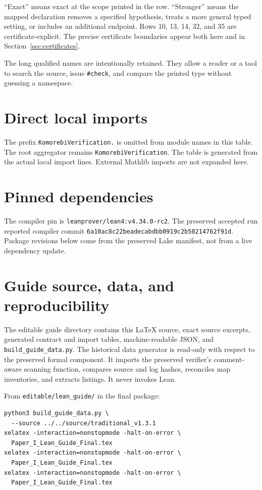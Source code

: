 \documentclass[11pt,a4paper]{article}
\newcommand{\code}[1]{\nolinkurl{#1}}
\begin{document}
``Exact'' means exact at the scope printed in the row. ``Stronger'' means the mapped declaration removes a specified hypothesis, treats a more general typed setting, or includes an additional endpoint. Rows 10, 13, 14, 32, and 35 are certificate-explicit. The precise certificate boundaries appear both here and in Section~\ref{sec:certificates}.

The long qualified names are intentionally retained. They allow a reader or a tool to search the source, issue \texttt{\#check}, and compare the printed type without guessing a namespace.


\clearpage
\appendix
\section{Direct local imports}\label{app:imports}
The prefix \code{KomorebiVerification.} is omitted from module names in this table. The root aggregator remains \code{KomorebiVerification}. The table is generated from the actual local import lines. External Mathlib imports are not expanded here.
{\small}

\section{Pinned dependencies}\label{app:pins}
The compiler pin is \code{leanprover/lean4:v4.34.0-rc2}. The preserved accepted run reported compiler commit \code{6a10ac8c22beadecabdbb0919c2b50214762f91d}. Package revisions below come from the preserved Lake manifest, not from a live dependency update.


\clearpage
\section{Guide source, data, and reproducibility}

The editable guide directory contains this \LaTeX{} source, exact source excerpts, generated contract and import tables, machine-readable JSON, and \code{build_guide_data.py}. The historical data generator is read-only with respect to the preserved formal component. It imports the preserved verifier's comment-aware scanning function, compares source and log hashes, reconciles map inventories, and extracts listings. It never invokes Lean.

From \code{editable/lean_guide/} in the final package:
\begin{lstlisting}
python3 build_guide_data.py \
  --source ../../source/traditional_v1.3.1
xelatex -interaction=nonstopmode -halt-on-error \
  Paper_I_Lean_Guide_Final.tex
xelatex -interaction=nonstopmode -halt-on-error \
  Paper_I_Lean_Guide_Final.tex
xelatex -interaction=nonstopmode -halt-on-error \
  Paper_I_Lean_Guide_Final.tex
\end{lstlisting}
\end{document}
